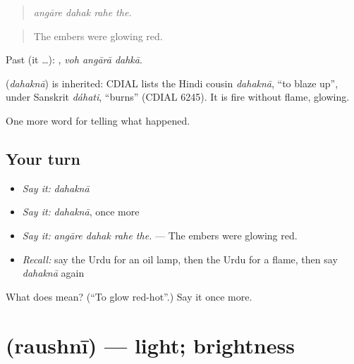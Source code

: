\begin{quote}
   
\end{quote}

\begin{quote}
\emph{angāre dahak rahe the.}
\end{quote}

\begin{quote}
The embers were glowing red.
\end{quote}

Past (it …):   , \emph{voh angārā dahkā}.

\begin{cousinweb}
\textbf{} (\emph{dahaknā}) is inherited: CDIAL lists the Hindi cousin \emph{dahaknā}, \textquotedblleft{}to blaze up\textquotedblright{}, under Sanskrit \emph{dáhati}, \textquotedblleft{}burns\textquotedblright{} (CDIAL 6245). It is fire without flame, glowing.
\end{cousinweb}

\begin{grammarlens}[title={What you've built}]
One more word for telling what happened.
\end{grammarlens}

\subsection*{Your turn}
\begin{itemize}
\raggedright
  \item \emph{Say it:} \emph{dahaknā}
  \item \emph{Say it:} \emph{dahaknā}, once more
  \item \emph{Say it:} \emph{angāre dahak rahe the.} — The embers were glowing red.
  \item \emph{Recall:} say the Urdu for an oil lamp, then the Urdu for a flame, then say \emph{dahaknā} again
\end{itemize}

\begin{tcolorbox}[breakable,colback=teal!4,colframe=teal!35!black,title={Before you move on}]
What does  mean? (\textquotedblleft{}To glow red-hot\textquotedblright{}.) Say it once more.
\end{tcolorbox}
\section[\texorpdfstring{\ur{روشنی} (raushnī)}{روشنی (raushnī)}]{ (raushnī) — light; brightness}

